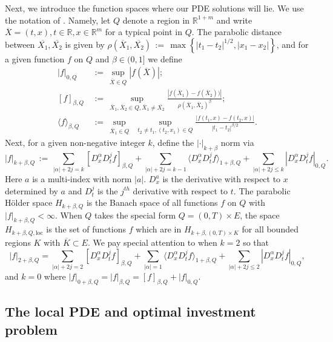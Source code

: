 \documentclass[11pt, letterpaper]{amsart}
\theoremstyle{definition}
\theoremstyle{remark}
\numberwithin{equation}{section}
\newcommand{\reals}{\mathbb R}
\newcommand{\dfn}{\, := \,}
\newcommand{\cbra}[1]{\left\{#1\right\}}
\newcommand{\ol}[1]{\overline{#1}}
\begin{document}
Next, we introduce the function spaces where our PDE solutions will lie. We use the notation of \cite[Chapters 1.3,4.1]{MR1465184}.  Namely, let $Q$ denote a region in $\reals^{1+m}$ and write $\ol{X} = (t,x), t\in\reals, x\in \reals^m$ for a typical point in $Q$. The parabolic distance between $\ol{X_1},\ol{X_2}$ is given by $\rho(\ol{X}_1,\ol{X_2}) \dfn \max\cbra{|t_1-t_2|^{1/2}, |x_1-x_2|}$, and for a given function $f$ on $Q$ and $\beta\in (0,1]$ we define
\begin{equation}\label{E:parabolic_holder_norms}
\begin{split}
|f|_{0,Q} &\dfn \sup_{\ol{X}\in Q}|f(\ol{X})|;\\
[f]_{\beta,Q} &\dfn \sup_{\ol{X}_1,\ol{X}_2\in Q,\ol{X}_1\neq \ol{X_2}} \frac{|f(\ol{X}_1)-f(\ol{X}_2))|}{\rho(\ol{X}_1,\ol{X}_2)^\beta};\\
\langle f \rangle_{\beta,Q} &\dfn \sup_{\ol{X}_1\in Q}\ \ \sup_{t_2\neq t_1, (t_2,x_1)\in Q} \frac{|f(t_1,x)-f(t_2,x)|}{|t_1-t_2|^{\beta/2}}.
\end{split}
\end{equation}
Next, for a given non-negative integer $k$, define the $|\cdot|_{k+\beta}$ norm via
\begin{equation}\label{E:parabolic_holder_k_beta}
|f|_{k+\beta, Q} \dfn \sum_{|\alpha| + 2j = k} [D^\alpha_x D^j_t f]_{\beta,Q} + \sum_{|\alpha| + 2j = k-1} \langle D^\alpha_x D^j_t f\rangle_{1+\beta,Q} + \sum_{|\alpha| + 2j\leq k} |D^\alpha_x D^j_t f|_{0,Q}.
\end{equation}
Here $a$ is a multi-index with norm $|a|$. $D^a_x$ is the derivative with respect to $x$ determined by $a$ and $D^j_t$ is the $j^{th}$ derivative with respect to $t$.  The parabolic H\"{o}lder space $H_{k+\beta,Q}$ is the Banach space of all functions $f$ on $Q$ with $|f|_{k+\beta,Q} < \infty$.  When $Q$ takes the special form $Q=(0,T)\times E$, the space $H_{k+\beta,Q,\textrm{loc}}$ is the set of functions $f$ which are in $H_{k+\beta,(0,T)\times K}$ for all bounded regions $K$ with $\ol{K}\subset E$. We pay special attention to when $k=2$ so that
\begin{equation}\label{E:parabolic_holder_2_beta}
|f|_{2+\beta, Q} = \sum_{|\alpha| + 2j = 2} [D^\alpha_x D^j_t f]_{\beta,Q} + \sum_{|\alpha| = 1} \langle D^\alpha_x D^j_t f\rangle_{1+\beta,Q} + \sum_{|\alpha| + 2j\leq 2} |D^\alpha_x D^j_t f|_{0,Q},
\end{equation}
and $k=0$ where $|f|_{0+\beta, Q}  = |f|_{\beta,Q} = [f]_{\beta,Q} + |f|_{0,Q}$.


\subsection{The local PDE and optimal investment problem}\label{SS:local}
\end{document}
